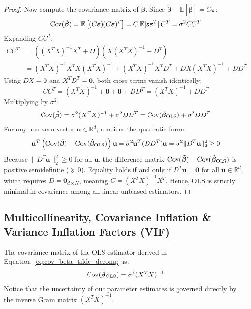 \begin{proof}
Now compute the covariance matrix of $\tilde{\boldsymbol{\beta}}$. Since $\tilde{\boldsymbol{\beta}} - \mathbb{E}[\tilde{\boldsymbol{\beta}}] = C \boldsymbol{\varepsilon}$:
\begin{equation}
\operatorname{Cov}(\tilde{\boldsymbol{\beta}}) = \mathbb{E}\left[ (C \boldsymbol{\varepsilon})(C \boldsymbol{\varepsilon})^T \right] = C\, \mathbb{E}[\boldsymbol{\varepsilon} \boldsymbol{\varepsilon}^T]\, C^T = \sigma^2 C C^T
\end{equation}
Expanding $C C^T$:
\begin{align}
C C^T &= \left( (X^T X)^{-1} X^T + D \right) \left( X(X^T X)^{-1} + D^T \right) \nonumber \\
&= (X^T X)^{-1} X^T X (X^T X)^{-1} + (X^T X)^{-1} X^T D^T + D X (X^T X)^{-1} + D D^T
\end{align}
Using $D X = \mathbf{0}$ and $X^T D^T = \mathbf{0}$, both cross-terms vanish identically:
\begin{equation}
C C^T = (X^T X)^{-1} + \mathbf{0} + \mathbf{0} + D D^T = (X^T X)^{-1} + D D^T
\end{equation}
Multiplying by $\sigma^2$:
\begin{equation}
\operatorname{Cov}(\tilde{\boldsymbol{\beta}}) = \sigma^2 (X^T X)^{-1} + \sigma^2 D D^T = \operatorname{Cov}(\hat{\boldsymbol{\beta}}_{\mathrm{OLS}}) + \sigma^2 D D^T
\label{eq:cov_beta_tilde_decomp}
\end{equation}
For any non-zero vector $\mathbf{u} \in \mathbb{R}^d$, consider the quadratic form:
\begin{equation}
\mathbf{u}^T \left( \operatorname{Cov}(\tilde{\boldsymbol{\beta}}) - \operatorname{Cov}(\hat{\boldsymbol{\beta}}_{\mathrm{OLS}}) \right) \mathbf{u} = \sigma^2 \mathbf{u}^T (D D^T) \mathbf{u} = \sigma^2 \|D^T \mathbf{u}\|_2^2 \ge 0
\end{equation}
Because $\|D^T \mathbf{u}\|_2^2 \ge 0$ for all $\mathbf{u}$, the difference matrix $\operatorname{Cov}(\tilde{\boldsymbol{\beta}}) - \operatorname{Cov}(\hat{\boldsymbol{\beta}}_{\mathrm{OLS}})$ is positive semidefinite ($\succeq 0$). Equality holds if and only if $D^T \mathbf{u} = \mathbf{0}$ for all $\mathbf{u} \in \mathbb{R}^d$, which requires $D = \mathbf{0}_{d \times N}$, meaning $C = (X^T X)^{-1} X^T$. Hence, OLS is strictly minimal in covariance among all linear unbiased estimators.
\end{proof}

\subsection{Multicollinearity, Covariance Inflation \& Variance Inflation Factors (VIF)}
The covariance matrix of the OLS estimator derived in Equation~\eqref{eq:cov_beta_tilde_decomp} is:
\begin{equation}
\operatorname{Cov}(\hat{\boldsymbol{\beta}}_{\mathrm{OLS}}) = \sigma^2 (X^T X)^{-1}
\label{eq:ols_cov_matrix}
\end{equation}
Notice that the uncertainty of our parameter estimates is governed directly by the inverse Gram matrix $(X^T X)^{-1}$.

